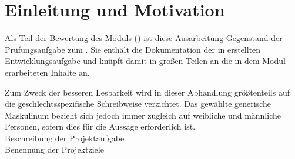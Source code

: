\chapter{Einleitung und Motivation}
\label{introduction-and-motivation}

Als Teil der Bewertung des Moduls \flqq \course (\courseAbbreviation)\frqq\xspace ist diese Ausarbeitung Gegenstand der Prüfungsaufgabe zum \semester. Sie enthält die Dokumentation der in  erstellten Entwicklungsaufgabe und knüpft damit in großen Teilen an die in dem Modul erarbeiteten Inhalte an.

Zum Zweck der besseren Lesbarkeit wird in dieser Abhandlung größtenteils auf die geschlechtsspezifische Schreibweise verzichtet.
Das gewählte generische Maskulinum bezieht sich jedoch immer zugleich auf weibliche und männliche Personen, sofern dies für die Aussage erforderlich ist.\\

Beschreibung der Projektaufgabe\\

Benennung der Projektziele\\